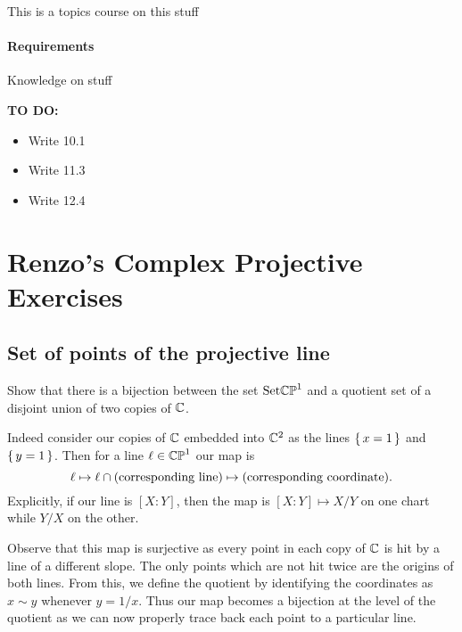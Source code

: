 \documentclass[12pt]{memoir}
\begin{document}
\maketitle
{\small 
\setlength{\parindent}{0em}
\setlength{\parskip}{1em}

This is a topics course on this stuff

\subsubsection*{Requirements}
Knowledge on stuff\par 

\textbf{TO DO:}
\begin{itemize}
    \item Write 10.1
    \item Write 11.3
    \item Write 12.4
\end{itemize}
}
\newpage
\tableofcontents
\chapter{Renzo's Complex Projective Exercises}

\section{Set of points of the projective line}

\begin{Ej}
    Show that there is a bijection between the set $\text{Set}\mathbb{CP}^1$
 and a quotient set of a disjoint union of two copies of $\mathbb{C}$.
\end{Ej}

\begin{ptcbr}
    Indeed consider our copies of $\mathbb{C}$ embedded into $\mathbb{C}^2$ as the lines $\{\,x=1\,\}$ and $\{\,y=1\,\}$. Then for a line $\ell\in\mathbb{CP}^1$ our map is 
    $$\ell\mapsto \ell\cap(\text{corresponding line})\mapsto (\text{corresponding coordinate}).$$
    Explicitly, if our line is $[X:Y]$, then the map is $[X:Y]\mapsto X/Y$ on one chart while $Y/X$ on the other.\par 
    Observe that this map is surjective as every point in each copy of $\mathbb{C}$ is hit by a line of a different slope. The only points which are not hit twice are the origins of both lines. From this, we define the quotient by identifying the coordinates as $x\sim y$ whenever $y=1/x$. Thus our map becomes a bijection at the level of the quotient as we can now properly trace back each point to a particular line. 
\end{ptcbr}
\end{document}
